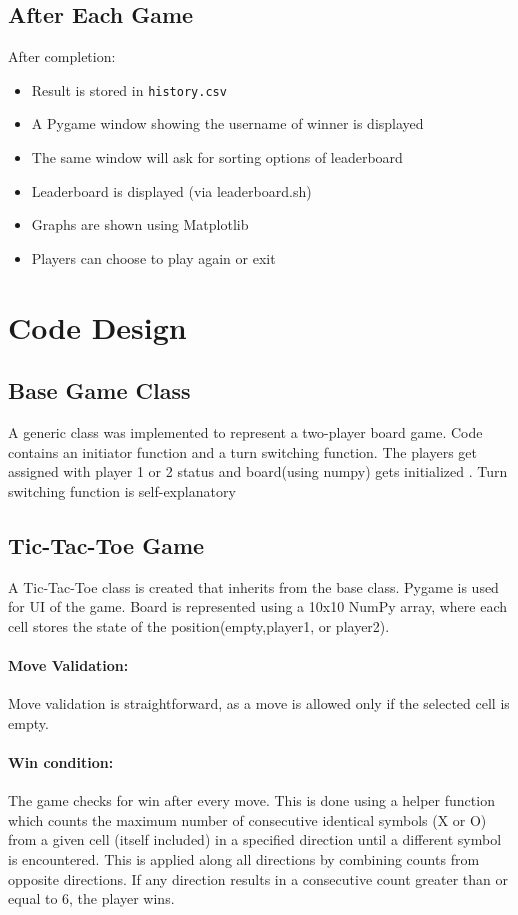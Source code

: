 \documentclass[12pt,a4paper]{article}
\begin{document}
\subsection{After Each Game}
After completion:
\begin{itemize}
    \item Result is stored in \texttt{history.csv}
    \item A Pygame window showing the username of winner is displayed
    \item The same window will ask for sorting options of leaderboard
    \item Leaderboard is displayed (via leaderboard.sh)
    \item Graphs are shown using Matplotlib
    \item Players can choose to play again or exit
\end{itemize}

\section{Code Design}

\subsection{Base Game Class}
A generic class was implemented to represent a two-player board game. Code contains an initiator function and a turn switching function. The players get assigned with player 1 or 2 status and board(using numpy) gets initialized . Turn switching function is self-explanatory 

\subsection{Tic-Tac-Toe Game}
A Tic-Tac-Toe class is created that inherits from the base class. Pygame is used for UI of the game. Board is represented using a 10x10 NumPy array, where each cell stores the state of the position(empty,player1, or player2).
\paragraph{Move Validation:}
Move validation is straightforward, as a move is allowed only if the selected cell is empty.
\paragraph{Win condition:}
The game checks for win after every move. This is done using a helper function which counts the maximum number of consecutive identical symbols (X or O) from a given cell (itself included) in a specified direction until a different symbol is encountered. This is applied along all directions by combining counts from opposite directions. If any direction results in a consecutive count greater than or equal to 6, the player wins.
\end{document}
